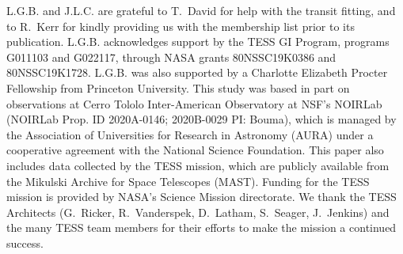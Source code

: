 \documentclass[12pt,modern,tighten]{aastex63}
\begin{document}



\acknowledgements
\raggedbottom

L.G.B{.} and J.L.C{.} are grateful to T{.}~David for help with the
transit fitting, and to R{.}~Kerr for kindly providing us with the
\citet{Kerr2021} membership list prior to its publication.
%
L.G.B{.} acknowledges support by the TESS GI Program, programs
G011103 and G022117, through NASA grants 80NSSC19K0386 and
80NSSC19K1728.
%
L.G.B{.} was also supported by a Charlotte Elizabeth Procter
Fellowship from Princeton University.
%
This study was based in part on observations at Cerro Tololo
Inter-American Observatory at NSF's NOIRLab (NOIRLab Prop{.} ID
2020A-0146; 2020B-0029 PI: Bouma), which is managed by the
Association of Universities for Research in Astronomy (AURA) under a
cooperative agreement with the National Science Foundation.
%
%
This paper also includes data collected by the TESS mission, which are
publicly available from the Mikulski Archive for Space Telescopes
(MAST).
%
Funding for the TESS mission is provided by NASA's Science Mission
directorate.
%
We thank the TESS Architects (G.~Ricker, R.~Vanderspek, D.~Latham,
S.~Seager, J.~Jenkins) and the many TESS team members for their
efforts to make the mission a continued success.
%

%
%


%
\end{document}
